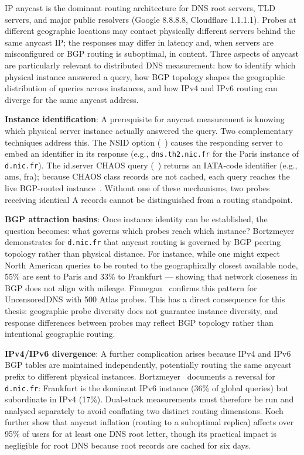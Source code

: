 \ac{IP} anycast is the dominant routing architecture for \ac{DNS} root servers, \ac{TLD} servers, and major public resolvers (Google 8.8.8.8, Cloudflare 1.1.1.1). Probes at different geographic locations may contact physically different servers behind the same anycast \ac{IP}; the responses may differ in latency and, when servers are misconfigured or \ac{BGP} routing is suboptimal, in content. Three aspects of anycast are particularly relevant to distributed \ac{DNS} measurement: how to identify which physical instance answered a query, how \ac{BGP} topology shapes the geographic distribution of queries across instances, and how \ac{IPv4} and \ac{IPv6} routing can diverge for the same anycast address.

\textbf{Instance identification}: A prerequisite for anycast measurement is knowing which physical server instance actually answered the query. Two complementary techniques address this. The \ac{NSID} option (~\cite{RFC5001}) causes the responding server to embed an identifier in its response (e.g., \texttt{dns.th2.nic.fr} for the Paris instance of \texttt{d.nic.fr}). The id.server CHAOS query (~\cite{RFC4892}) returns an IATA-code identifier (e.g., ams, fra); because CHAOS class records are not cached, each query reaches the live \ac{BGP}-routed instance~\cite{Finnegan2018}. Without one of these mechanisms, two probes receiving identical \ac{A} records cannot be distinguished from a routing standpoint.

\textbf{\ac{BGP} attraction basins}: Once instance identity can be established, the question becomes: what governs which probes reach which instance? Bortzmeyer~\cite{Bortzmeyer2013} demonstrates for \texttt{d.nic.fr} that anycast routing is governed by \ac{BGP} peering topology rather than physical distance. For instance, while one might expect North American queries to be routed to the geographically closest available node, 55\% are sent to Paris and 33\% to Frankfurt — showing that network closeness in \ac{BGP} does not align with mileage. Finnegan~\cite{Finnegan2018} confirms this pattern for UncensoredDNS with 500 Atlas probes. This has a direct consequence for this thesis: geographic probe diversity does not guarantee instance diversity, and response differences between probes may reflect \ac{BGP} topology rather than intentional geographic routing.

\textbf{\ac{IPv4}/\ac{IPv6} divergence}: A further complication arises because \ac{IPv4} and \ac{IPv6} \ac{BGP} tables are maintained independently, potentially routing the same anycast prefix to different physical instances. Bortzmeyer~\cite{Bortzmeyer2013} documents a reversal for \texttt{d.nic.fr}: Frankfurt is the dominant \ac{IPv6} instance (36\% of global queries) but subordinate in \ac{IPv4} (17\%). Dual-stack measurements must therefore be run and analysed separately to avoid conflating two distinct routing dimensions. Koch~\cite{Koch2021} further show that anycast inflation (routing to a suboptimal replica) affects over 95\% of users for at least one \ac{DNS} root letter, though its practical impact is negligible for root \ac{DNS} because root records are cached for six days.


